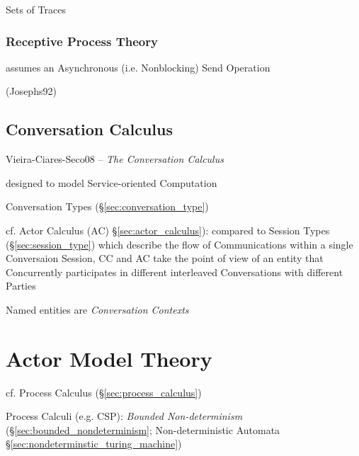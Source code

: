 Sets of Traces



\subsubsection{Receptive Process Theory}\label{sec:receptive_process}

assumes an Asynchronous (i.e. Nonblocking) Send Operation

(Josephs92)



\subsection{Conversation Calculus}\label{sec:conversation_calculus}

Vieira-Ciares-Seco08 -- \emph{The Conversation Calculus}

designed to model Service-oriented Computation

\fist Conversation Types (\S\ref{sec:conversation_type})

\fist cf. Actor Calculus (AC) \S\ref{sec:actor_calculus}): compared to
Session Types (\S\ref{sec:session_type}) which describe the flow of
Communications within a single Conversaion Session, CC and AC take the
point of view of an entity that Concurrently participates in different
interleaved Conversations with different Parties

Named entities are \emph{Conversation Contexts}



\section{Actor Model Theory}\label{sec:actor_model}

\begingroup

\newcommand{\actord}{\xrightarrow{\approx}}
\newcommand{\arrord}[1]{\xrightarrow{#1}}
\newcommand{\cmbord}{\rightarrow}

\fist cf. Process Calculus (\S\ref{sec:process_calculus})

Process Calculi (e.g. CSP): \emph{Bounded Non-determinism}
(\S\ref{sec:bounded_nondeterminism}; \fist Non-deterministic Automata
\S\ref{sec:nondeterminstic_turing_machine})

